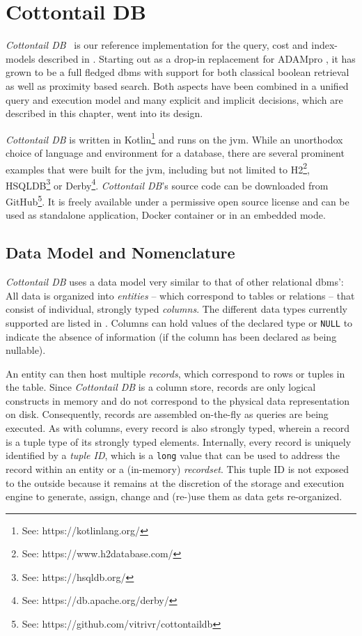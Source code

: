 \chapter{Cottontail DB}
\label{chapter:cottontaildb}

\emph{Cottontail DB}~\cite{Gasser:2020cottontail} is our reference implementation for the query, cost and index-models described in . Starting out as a drop-in replacement for ADAMpro \cite{Giangreco:2016adam}, it has grown to be a full fledged \acrshort{dbms} with support for both classical boolean retrieval as well as proximity based search. Both aspects have been combined in a unified query and execution model and many explicit and implicit decisions, which are described in this chapter, went into its design.

\emph{Cottontail DB} is written in Kotlin\footnote{See: https://kotlinlang.org/} and runs on the \acrfull{jvm}. While an unorthodox choice of language and environment for a database, there are several prominent examples that were built for the \acrshort{jvm}, including but not limited to H2\footnote{See: https://www.h2database.com/}, HSQLDB\footnote{See: https://hsqldb.org/} or Derby\footnote{See: https://db.apache.org/derby/}. \emph{Cottontail DB}'s source code can be downloaded from GitHub\footnote{See: https://github.com/vitrivr/cottontaildb}. It is freely available under a permissive open source license and can be used as standalone application, Docker container or in an embedded mode.

\section{Data Model and Nomenclature} 

\emph{Cottontail DB} uses a data model very similar to that of other relational \acrshort{dbms}': All data is organized into \emph{entities} -- which correspond to tables or relations -- that consist of individual, strongly typed \emph{columns}. The different data types currently supported are listed in . Columns can hold values of the declared type or \texttt{NULL} to indicate the absence of information (if the column has been declared as being nullable). 

An entity can then host multiple \emph{records}, which correspond to rows or tuples in the table. Since \emph{Cottontail DB} is a column store, records are only logical constructs in memory and do not correspond to the physical data representation on disk. Consequently, records are assembled on-the-fly as queries are being executed. As with columns, every record is also strongly typed, wherein a record is a tuple type of its strongly typed elements. Internally, every record is uniquely identified by a \emph{tuple ID}, which is a \texttt{long} value that can be used to address the record within an entity or a (in-memory) \emph{recordset}. This tuple ID is not exposed to the outside because it remains at the discretion of the storage and execution engine to generate, assign, change and (re-)use them as data gets re-organized.

